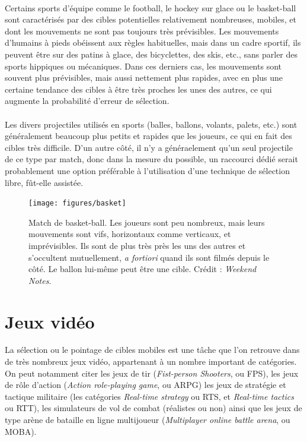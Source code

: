 	\paragraph{}
	Certains sports d'équipe comme le football, le hockey sur glace ou le basket-ball sont caractérisés par des cibles potentielles relativement nombreuses, mobiles, et dont les mouvements ne sont pas toujours très prévisibles. Les mouvements d'humains à pieds obéissent aux règles habituelles, mais dans un cadre sportif, ils peuvent être sur des patins à glace, des bicyclettes, des skis, etc., sans parler des sports hippiques ou mécaniques. Dans ces derniers cas, les mouvements sont souvent plus prévisibles, mais aussi nettement plus rapides, avec en plus une certaine tendance des cibles à être très proches les unes des autres, ce qui augmente la probabilité d'erreur de sélection.
	
	\paragraph{}
	Les divers projectiles utilisés en sports (balles, ballons, volants, palets, etc.) sont généralement beaucoup plus petits et rapides que les joueurs, ce qui en fait des cibles très difficile. D'un autre côté, il n'y a généraelement qu'un seul projectile de ce type par match, donc dans la mesure du possible, un raccourci dédié serait probablement une option préférable à l'utilisation d'une technique de sélection libre, fût-elle assistée.
	
	\begin{figure}[ht]
		\centering
		\texttt{[image: figures/basket]}
		\caption{Match de basket-ball. Les joueurs sont peu nombreux, mais leurs mouvements sont vifs, horizontaux comme verticaux, et imprévisibles. Ils sont de plus très près les uns des autres et s'occultent mutuellement, \emph{a fortiori} quand ils sont filmés depuis le côté. Le ballon lui-même peut être une cible. Crédit : \emph{Weekend Notes}.}
		\label{fig:basketball}
	\end{figure}
	
	\section{Jeux vidéo}
	La sélection ou le pointage de cibles mobiles est une tâche que l'on retrouve dans de très nombreux jeux vidéo, appartenant à un nombre important de catégories. On peut notamment citer les jeux de tir (\emph{Fist-person Shooters}, ou FPS), les jeux de rôle d'action (\emph{Action role-playing game}, ou ARPG) les jeux de stratégie et tactique militaire (les catégories \emph{Real-time strategy} ou RTS, et \emph{Real-time tactics} ou RTT), les simulateurs de vol de combat (réalistes ou non) ainsi que les jeux de type arène de bataille en ligne multijoueur (\emph{Multiplayer online battle arena}, ou MOBA).
	
